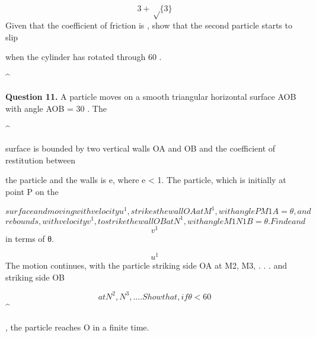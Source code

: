 \documentclass[12pt]{article}
\begin{document}
\begin{flushleft}
\[3 + \sqrt\{3\}\]
Given that the coefficient of friction is , show that the second particle starts to slip\par
when the cylinder has rotated through 60 .\par
\textasciicircum{}\circ\par
\bigskip\textbf{Question 11.} A particle moves on a smooth triangular horizontal surface AOB with angle AOB = 30 . The\par
\textasciicircum{}\circ\par
surface is bounded by two vertical walls OA and OB and the coefficient of restitution between\par
the particle and the walls is e, where e < 1. The particle, which is initially at point P on the\par
\[surface and moving with velocity u^1, strikes the wall OA at M^1, with angle P M1A = θ, and\]
\[rebounds, with velocity v^1, to strike the wall OB at N^1, with angle M1N1B = θ. Find e and\]
\[v^1\]
in terms of θ.\par
\[u^1\]
The motion continues, with the particle striking side OA at M2, M3, . . . and striking side OB\par
\[at N^2, N^3, . . .. Show that, if θ < 60\]
\textasciicircum{}\circ\par
, the particle reaches O in a finite time.\par
\end{flushleft}
\end{document}
